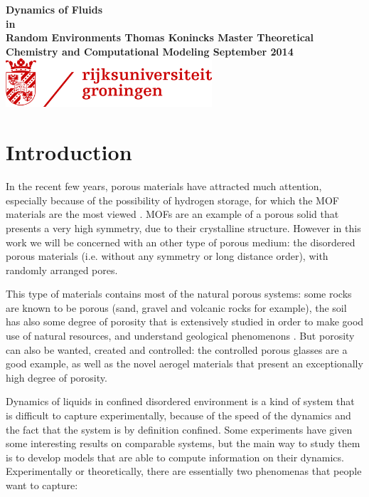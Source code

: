 \documentclass[a4paper,12pt]{article}
\newcommand{\jline}{\vspace{10pt}}
\begin{document}


\begin{titlepage}
    \centering
    \vfill
    {\bf{\Huge
    Dynamics of Fluids\\in\\Random Environments
    \vfill
    \LARGE
    Thomas Konincks
    \vskip1cm
    Master Theoretical Chemistry and Computational Modeling
    \vfill
    \LARGE September 2014}}    
    \vfill
    \includegraphics[height=1.8cm]{logos/logo_rug.png}
\end{titlepage}

\newpage

\tableofcontents

\section{Introduction}

In the recent few years, porous materials have attracted much attention, especially because of the possibility of hydrogen storage, 
for which the MOF materials are the most viewed \cite{Yan2009}. MOFs are an example of a porous solid that presents a very high symmetry, 
due to their crystalline structure. However in this work we will be concerned with an other type of porous medium: the disordered porous
materials (i.e. without any symmetry or long distance order), with randomly arranged pores.\jline

This type of materials contains most of the natural porous systems: some rocks are known to be porous (sand, gravel and volcanic rocks 
for example), the soil has also some degree of porosity that is extensively studied in order to make good use of natural resources, and 
understand geological phenomenons \cite{Nasta2009, Grosbellet2011, Gab2014, Walczak2006}. But porosity can also be wanted, created and 
controlled: the controlled porous glasses are a good example, as well as the novel aerogel materials that present an exceptionally high
degree of porosity.\jline

Dynamics of liquids in confined disordered environment is a kind of system that is difficult to capture experimentally, because of the 
speed of the dynamics and the fact that the system is by definition confined. Some experiments have given some interesting results on 
comparable systems, but the main way to study them is to develop models that are able to compute information on their dynamics. 
Experimentally or theoretically, there are essentially two phenomenas that people want to capture:
\end{document}
